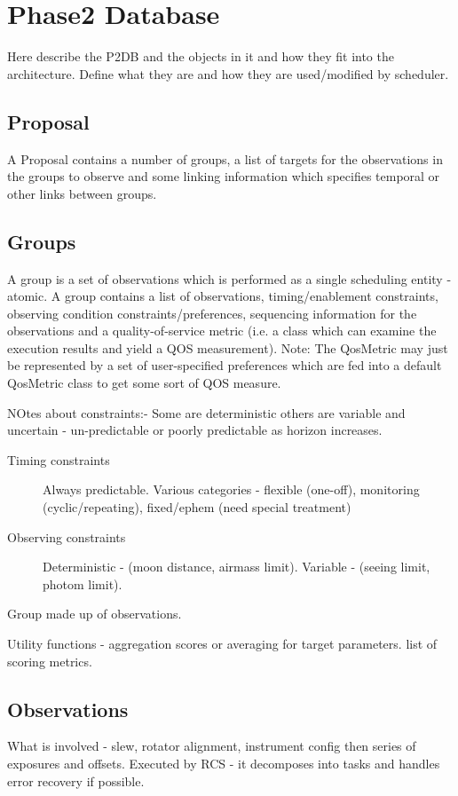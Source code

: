 \appendix

\newpage
\section{Phase2 Database}
\label{sect:app_phase2db}
Here describe the P2DB and the objects in it and how they fit into the architecture. Define what they are and how they are used/modified by scheduler.

\subsection{Proposal}
A Proposal contains a number of groups, a list of targets for the observations in the groups to observe and some linking information which specifies temporal or other links between groups.

\subsection{Groups}
A group is a set of observations which is performed as a single scheduling entity - atomic. A group contains a list of observations, timing/enablement constraints, observing condition constraints/preferences, sequencing information for the observations and a quality-of-service metric (i.e. a class which can examine the execution results and yield a QOS measurement). 
Note: The QosMetric may just be represented by a set of user-specified preferences which are fed into a default QosMetric class to get some sort of QOS measure.

NOtes about constraints:-
Some are deterministic others are variable and uncertain - un-predictable or poorly predictable as horizon increases.
\begin{description}
\item[Timing constraints]
Always predictable. Various categories - flexible (one-off), monitoring (cyclic/repeating), fixed/ephem (need special treatment)  
\item[Observing constraints]
Deterministic - (moon distance, airmass limit).
Variable - (seeing limit, photom limit).
\end{description}

Group made up of observations.

Utility functions - aggregation scores or averaging for target parameters.
list of scoring metrics. 

\subsection{Observations}
What is involved - slew, rotator alignment, instrument config then series of exposures and offsets.
Executed by RCS - it decomposes into tasks and handles error recovery if possible.

